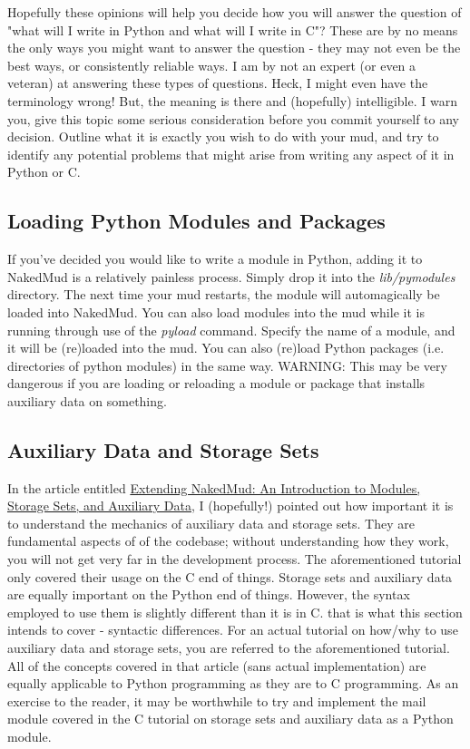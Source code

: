 \documentclass[12pt]{article}
\begin{document}
Hopefully these opinions will help you decide how you will answer the question of "what will I write in Python and what will I write in C"? These are by no means the only ways you might want to answer the question - they may not even be the best ways, or consistently reliable ways. I am by not an expert (or even a veteran) at answering these types of questions. Heck, I might even have the terminology wrong! But, the meaning is there and (hopefully) intelligible. I warn you, give this topic some serious consideration before you commit yourself to any decision. Outline what it is exactly you wish to do with your mud, and try to identify any potential problems that might arise from writing any aspect of it in Python or C.

\subsection{Loading Python Modules and Packages}
If you've decided you would like to write a module in Python, adding it to NakedMud is a relatively painless process. Simply drop it into the {\it lib/pymodules} directory. The next time your mud restarts, the module will automagically be loaded into NakedMud. You can also load modules into the mud while it is running through use of the {\it pyload} command. Specify the name of a module, and it will be (re)loaded into the mud. You can also (re)load Python packages (i.e. directories of python modules) in the same way. WARNING: This may be very dangerous if you are loading or reloading a module or package that installs auxiliary data on something.


\subsection{Auxiliary Data and Storage Sets}
In the article entitled \uline{Extending NakedMud: An Introduction to Modules, Storage Sets, and Auxiliary Data}, I (hopefully!) pointed out how important it is to understand the mechanics of auxiliary data and storage sets. They are fundamental aspects of of the codebase; without understanding how they work, you will not get very far in the development process. The aforementioned tutorial only covered their usage on the C end of things. Storage sets and auxiliary data are equally important on the Python end of things. However, the syntax employed to use them is slightly different than it is in C. that is what this section intends to cover - syntactic differences. For an actual tutorial on how/why to use auxiliary data and storage sets, you are referred to the aforementioned tutorial. All of the concepts covered in that article (sans actual implementation) are equally applicable to Python programming as they are to C programming. As an exercise to the reader, it may be worthwhile to try and implement the mail module covered in the C tutorial on storage sets and auxiliary data as a Python module.
\end{document}
